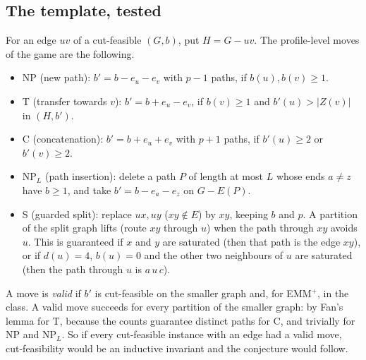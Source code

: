 \documentclass[11pt]{amsart}
\theoremstyle{definition}
\begin{document}
\subsection*{The template, tested}
For an edge $uv$ of a cut-feasible $(G,b)$, put $H=G-uv$. The profile-level moves of the game are
the following.
\begin{itemize}
\item NP (new path): $b'=b-e_u-e_v$ with $p-1$ paths, if $b(u),b(v)\ge1$.
\item T (transfer towards $v$): $b'=b+e_u-e_v$, if $b(v)\ge1$ and $b'(u)>|Z(v)|$ in $(H,b')$.
\item C (concatenation): $b'=b+e_u+e_v$ with $p+1$ paths, if $b'(u)\ge2$ or $b'(v)\ge2$.
\item $\mathrm{NP}_L$ (path insertion): delete a path $P$ of length at most $L$ whose ends $a\ne z$
have $b\ge1$, and take $b'=b-e_a-e_z$ on $G-E(P)$.
\item S (guarded split): replace $ux,uy$ ($xy\notin E$) by $xy$, keeping $b$ and $p$. A partition of
the split graph lifts (route $xy$ through $u$) when the path through $xy$ avoids $u$. This is
guaranteed if $x$ and $y$ are saturated (then that path is the edge $xy$), or if $d(u)=4$, $b(u)=0$
and the other two neighbours of $u$ are saturated (then the path through $u$ is $a\,u\,c$).
\end{itemize}
A move is \emph{valid} if $b'$ is cut-feasible on the smaller graph and, for EMM$^+$, in the class.
A valid move succeeds for every partition of the smaller graph: by Fan's lemma for T, because the
counts guarantee distinct paths for C, and trivially for NP and $\mathrm{NP}_L$. So if every
cut-feasible instance with an edge had a valid move, cut-feasibility would be an inductive
invariant and the conjecture would follow.
\end{document}
